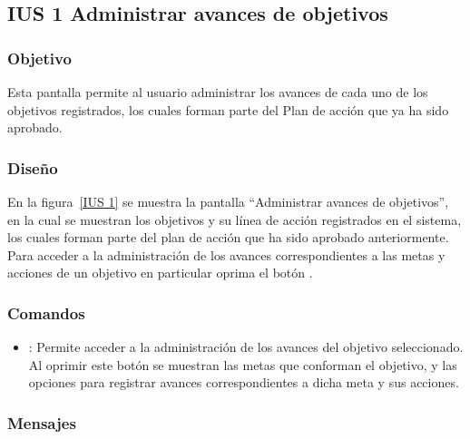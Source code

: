 \subsection{IUS 1 Administrar avances de objetivos}

\subsubsection{Objetivo}
	
    Esta pantalla permite al usuario  administrar los avances de cada uno de los objetivos registrados, los cuales forman parte del Plan de acción que ya ha sido aprobado.
\subsubsection{Diseño}

    En la figura~\ref{IUS 1} se muestra la pantalla ``Administrar avances de objetivos'', en la cual se muestran los objetivos y su línea de acción registrados en el sistema, los cuales forman parte del plan de acción que ha sido aprobado anteriormente. Para acceder a la administración de los avances correspondientes a las metas y acciones de un objetivo en particular oprima el botón \botAcciones.



\subsubsection{Comandos}
    \begin{itemize}
	\item {}: Permite acceder a la administración de los avances del objetivo seleccionado. Al oprimir este botón se muestran las metas que conforman el objetivo, y las opciones para registrar avances correspondientes a dicha meta y sus acciones.
    \end{itemize}

\subsubsection{Mensajes}

